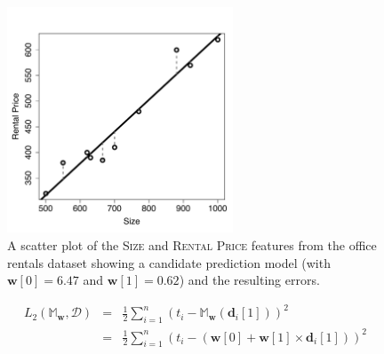 \documentclass[xcolor={table}]{beamer}
\newcommand{\featN}[1]{\textsc{#1}}
\begin{document}
\begin{frame}
\begin{figure}[htb]
\begin{center}
\includegraphics[width=0.6\textwidth]{./images/linearRegressionDemoFinalModelWithErrorDropdowns_mod.pdf}
\caption{A scatter plot of the \featN{Size} and \featN{Rental Price} features from the office rentals dataset showing a candidate prediction model (with $\mathbf{w}[0] = 6.47$ and $\mathbf{w}[1] = 0.62$) and the resulting errors.}
\label{fig:officeSizesAndPricesWithModelAndErrors}
\end{center}
\end{figure}
\end{frame} 

 \begin{frame} 
\begin{eqnarray}
L_2(\mathbb{M}_{\mathbf{w}}, \mathcal{D}) & = & \frac{1}{2} \sum_{i=1}^{n} \left(t_i - \mathbb{M}_{\mathbf{w}}(\mathbf{d}_i[1])\right)^2 \\
								  & = & \frac{1}{2} \sum_{i=1}^{n} \left(t_i - (\mathbf{w}[0] + \mathbf{w}[1]\times\mathbf{d}_i[1])\right)^2 
\label{eq:l2LossFunc}
\end{eqnarray}
\end{frame} 
\end{document}
